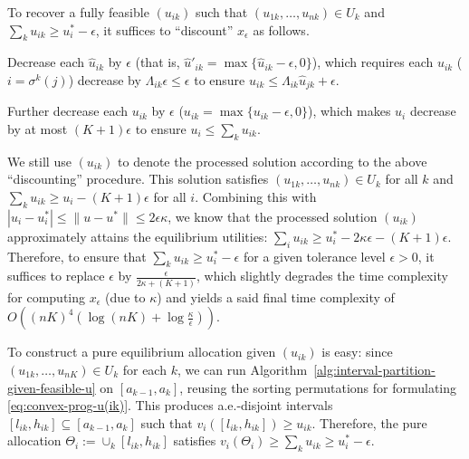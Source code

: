 To recover a fully feasible $(u_{ik})$ such that $(u_{1k}, \dots, u_{nk}) \in U_k$ and $\sum_k u_{ik} \geq u^*_i - \epsilon$, it suffices to ``discount'' $x_\epsilon$ as follows.
\begin{enumerate*}[(i)]
	\item Decrease each $\hat{u}_{ik}$ by $\epsilon$ (that is, $\hat{u}'_{ik} = \max\{ \hat{u}_{ik}-\epsilon,0 \}$), which requires each $u_{ik}$ ($i=\sigma^k(j)$) decrease by $\Lambda_{ik} \epsilon\leq \epsilon$ to ensure $u_{ik} \leq \Lambda_{ik} \hat{u}_{jk} + \epsilon$.
	\item Further decrease each $u_{ik}$ by $\epsilon$ ($u_{ik} = \max\{ u_{ik} - \epsilon, 0 \}$), which makes $u_i$ decrease by at most $(K+1) \epsilon$ to ensure $ u_i \leq \sum_k u_{ik}$.
\end{enumerate*}
We still use $(u_{ik})$ to denote the processed solution according to the above ``discounting'' procedure. This solution satisfies $(u_{1k}, \dots, u_{nk})\in U_k$ for all $k$ and $\sum_k u_{ik} \geq u_i - (K+1)\epsilon$ for all $i$. Combining this with $|u_i - u^*_i| \leq \|u-u^*\| \leq 2\epsilon \kappa$, we know that the processed solution $(u_{ik})$ approximately attains the equilibrium utilities:
$\sum_i u_{ik} \geq u^*_i - 2\kappa \epsilon - (K+1)\epsilon$.
Therefore, to ensure that $\sum_k u_{ik} \geq u^*_i - \epsilon$ for a given tolerance level $\epsilon>0$, it suffices to replace $\epsilon$ by $\frac{\epsilon}{2\kappa+ (K+1)}$, which slightly degrades the time complexity for computing $x_\epsilon$ (due to $\kappa$) and yields a said final time complexity of 
$O\left( (nK)^4 \left(\log (nK) + \log \frac{\kappa}{\epsilon}  \right) \right)$.

To construct a pure equilibrium allocation given $(u_{ik})$ is easy: since $(u_{1k}, \dots, u_{nK})\in U_k$ for each $k$, we can run Algorithm~\ref{alg:interval-partition-given-feasible-u} on $[a_{k-1}, a_k]$, reusing the sorting permutations for formulating \eqref{eq:convex-prog-u(ik)}. This produces a.e.-disjoint intervals $[l_{ik}, h_{ik}]\subseteq [a_{k-1}, a_k]$ such that $v_i([l_{ik}, h_{ik}]) \geq u_{ik}$. Therefore, the pure allocation $\Theta_i := \cup_k [l_{ik}, h_{ik}]$ satisfies
$v_i(\Theta_i) \geq \sum_k u_{ik} \geq u^*_i - \epsilon$. 

